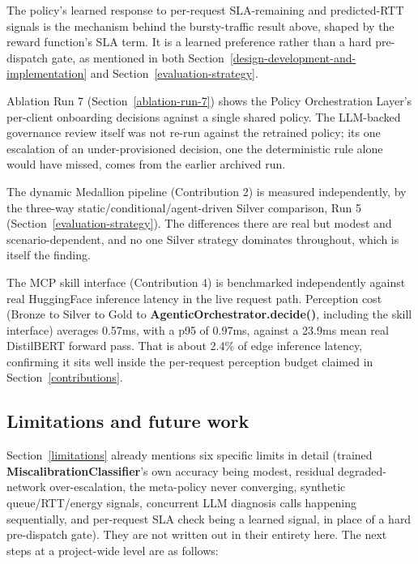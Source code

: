 The policy's learned response to per-request SLA-remaining and
predicted-RTT signals is the mechanism behind the bursty-traffic result
above, shaped by the reward function's SLA term. It is a learned
preference rather than a hard pre-dispatch gate, as mentioned in both
Section~\ref{design-development-and-implementation} and Section~\ref{evaluation-strategy}.

Ablation Run 7 (Section~\ref{ablation-run-7}) shows the Policy Orchestration Layer's
per-client onboarding decisions against a single shared policy. The
LLM-backed governance review itself was not re-run against the
retrained policy; its one escalation of an under-provisioned decision,
one the deterministic rule alone would have missed, comes from the
earlier archived run.

The dynamic Medallion pipeline (Contribution 2) is measured
independently, by the three-way static/conditional/agent-driven Silver
comparison, Run 5 (Section~\ref{evaluation-strategy}). The differences there are real but
modest and scenario-dependent, and no one Silver strategy dominates
throughout, which is itself the finding.

The MCP skill interface (Contribution 4) is benchmarked independently
against real HuggingFace inference latency in the live request path.
Perception cost (Bronze to Silver to Gold to
\textbf{AgenticOrchestrator.decide()}, including the skill interface)
averages 0.57ms, with a p95 of 0.97ms, against a 23.9ms mean real
DistilBERT forward pass. That is about 2.4\% of edge inference latency,
confirming it sits well inside the per-request perception budget
claimed in Section~\ref{contributions}.

\hypertarget{limitations-and-future-work}{%
\subsection{Limitations and future work}\label{limitations-and-future-work}}

Section~\ref{limitations} already mentions six specific limits in
detail (trained \textbf{MiscalibrationClassifier}'s own accuracy
being modest, residual degraded-network over-escalation, the
meta-policy never converging, synthetic queue/RTT/energy signals,
concurrent LLM diagnosis calls happening sequentially, and per-request
SLA check being a learned signal, in place of a hard pre-dispatch
gate). They are not written out in their entirety here. The next steps
at a project-wide level are as follows:

